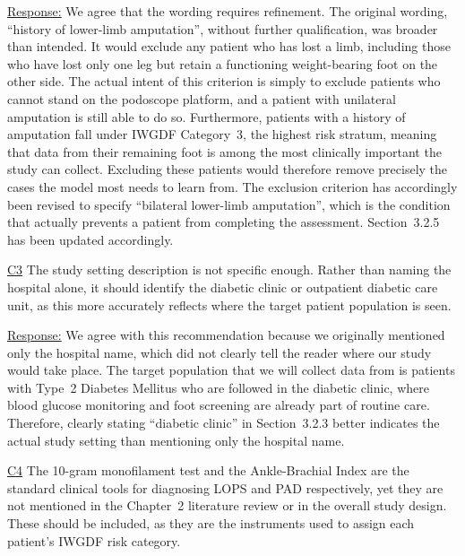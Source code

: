 \documentclass[12pt,a4paper]{article}
\newcommand{\cid}[1]{{\color{cidred}\underline{#1}}}
\newcommand{\mref}[1]{%
  \marginnote{%
    \color{respblue}\scriptsize
    \rule[-0.3ex]{0.6pt}{1.4ex}\hspace{4pt}%
    \parbox[t]{2.4cm}{\raggedright #1}%
  }%
}
\newenvironment{response}{%
  \par\color{respblue}%
}{\par}
\begin{document}
\mref{\S~3.2.5\\[2pt]Exclusion\\Criteria}
\begin{response}
\underline{Response:} We agree that the wording requires refinement. The original wording, ``history of lower-limb amputation'', without further qualification, was broader than intended. It would exclude any patient who has lost a limb, including those who have lost only one leg but retain a functioning weight-bearing foot on the other side. The actual intent of this criterion is simply to exclude patients who cannot stand on the podoscope platform, and a patient with unilateral amputation is still able to do so. Furthermore, patients with a history of amputation fall under IWGDF Category~3, the highest risk stratum, meaning that data from their remaining foot is among the most clinically important the study can collect. Excluding these patients would therefore remove precisely the cases the model most needs to learn from. The exclusion criterion has accordingly been revised to specify ``bilateral lower-limb amputation'', which is the condition that actually prevents a patient from completing the assessment. Section~3.2.5 has been updated accordingly.
\end{response}

\cid{C3} The study setting description is not specific enough. Rather than naming the hospital alone, it should identify the diabetic clinic or outpatient diabetic care unit, as this more accurately reflects where the target patient population is seen.

\mref{\S~3.2.3\\[2pt]Data Source}
\begin{response}
\underline{Response:} We agree with this recommendation because we originally mentioned only the hospital name, which did not clearly tell the reader where our study would take place. The target population that we will collect data from is patients with Type~2 Diabetes Mellitus who are followed in the diabetic clinic, where blood glucose monitoring and foot screening are already part of routine care. Therefore, clearly stating ``diabetic clinic'' in Section~3.2.3 better indicates the actual study setting than mentioning only the hospital name.
\end{response}

\cid{C4} The 10-gram monofilament test and the Ankle-Brachial Index are the standard clinical tools for diagnosing LOPS and PAD respectively, yet they are not mentioned in the Chapter~2 literature review or in the overall study design. These should be included, as they are the instruments used to assign each patient's IWGDF risk category.
\end{document}
